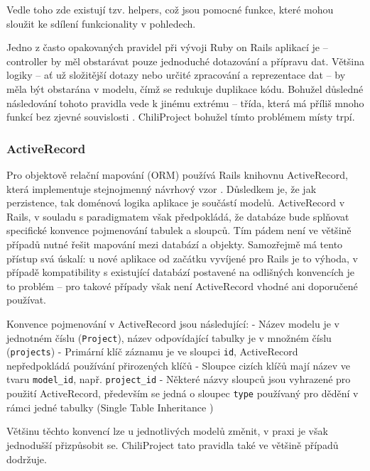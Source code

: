 \documentclass[thesis=B,czech]{FITthesis}[2012/05/02]
\begin{document}
Vedle toho zde existují tzv. helpers, což jsou pomocné funkce, které
mohou sloužit ke sdílení funkcionality v pohledech.

Jedno z často opakovaných pravidel při vývoji Ruby on Rails aplikací je
\citep{Buck2006} -- controller by měl
obstarávat pouze jednoduché dotazování a přípravu dat. Většina logiky --
ať už složitější dotazy nebo určité zpracování a reprezentace dat -- by
měla být obstarána v modelu, čímž se redukuje duplikace kódu. Bohužel
důsledné následování tohoto pravidla vede k jinému extrému -- třída,
která má příliš mnoho funkcí bez zjevné souvislosti \citep{Libbery2011}.
ChiliProject bohužel tímto problémem místy trpí.

\subsubsection{ActiveRecord}

Pro objektově relační mapování (ORM) používá Rails knihovnu
ActiveRecord, která implementuje stejnojmenný návrhový vzor \citep[str.
160]{Fowler2003}. Důsledkem je, že jak perzistence, tak doménová logika
aplikace je součástí modelů. ActiveRecord v Rails, v souladu s
paradigmatem  však předpokládá, že
databáze bude splňovat specifické konvence pojmenování tabulek a
sloupců. Tím pádem není ve většině případů nutné řešit mapování mezi
databází a objekty. Samozřejmě má tento přístup svá úskalí: u nové
aplikace od začátku vyvíjené pro Rails je to výhoda, v případě
kompatibility s existující databází postavené na odlišných konvencích je
to problém -- pro takové případy však není ActiveRecord vhodné ani
doporučené používat.

Konvence pojmenování v ActiveRecord jsou následující: - Název modelu je
v jednotném číslu (\lstinline!Project!), název odpovídající tabulky je v
množném číslu (\lstinline!projects!) - Primární klíč záznamu je ve
sloupci \lstinline!id!, ActiveRecord nepředpokládá používání přirozených
klíčů - Sloupce cizích klíčů mají název ve tvaru \lstinline!model_id!,
např. \lstinline!project_id! - Některé názvy sloupců jsou vyhrazené pro
použití ActiveRecord, především se jedná o sloupec \lstinline!type!
používaný pro dědění v rámci jedné tabulky (Single Table Inheritance
\citep[str. 278]{Fowler2003})

Většinu těchto konvencí lze u jednotlivých modelů změnit, v praxi je
však jednodušší přizpůsobit se. ChiliProject tato pravidla také ve
většině případů dodržuje.
\end{document}
